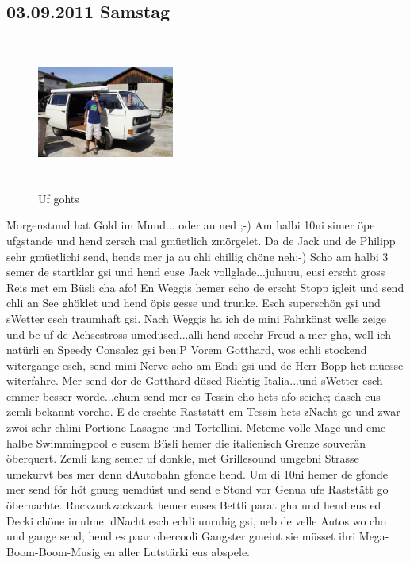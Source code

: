 \subsection{03.09.2011 Samstag}
\begin{figure} 
  \begin{centering}
    \includegraphics[width=0.4\textwidth, height=5cm, keepaspectratio]{../Bilder/Korsika/1.jpg}
    \caption{Uf gohts}
  \end{centering}
\end{figure} 
Morgenstund hat Gold im Mund... oder  au ned ;-) Am halbi 10ni simer öpe ufgstande und hend zersch mal gmüetlich zmörgelet.
Da de Jack und de Philipp sehr gmüetlichi send, hends mer ja au chli chillig chöne neh;-) Scho am halbi 3 semer de startklar gsi und hend euse Jack vollglade...juhuuu, eusi erscht gross Reis met em Büsli cha afo! En Weggis hemer scho de erscht Stopp igleit und send chli an See ghöklet und hend öpis gesse und trunke.
Esch superschön gsi und sWetter esch traumhaft gsi.
Nach Weggis ha ich de mini Fahrkönst welle zeige und be uf de Achsestross umedüsed...alli hend seeehr Freud a mer gha, well ich natürli en Speedy Consalez gsi ben:P
Vorem Gotthard, wos echli stockend witergange esch, send mini Nerve scho am Endi gsi und de Herr Bopp het müesse witerfahre.
Mer send dor de Gotthard düsed Richtig Italia...und sWetter esch emmer besser worde...chum send mer es Tessin cho hets afo seiche; dasch eus zemli bekannt vorcho.
E de erschte Raststätt em Tessin hets zNacht ge und zwar zwoi sehr chlini Portione Lasagne und Tortellini.
Meteme volle Mage und eme halbe Swimmingpool e eusem Büsli hemer die italienisch Grenze souverän öberquert.
Zemli lang semer uf donkle, met Grillesound umgebni Strasse umekurvt bes mer denn dAutobahn gfonde hend.
Um di 10ni hemer de gfonde mer send för höt gnueg uemdüst und send e Stond vor Genua ufe Raststätt go öbernachte.
Ruckzuckzackzack hemer euses Bettli parat gha und hend eus ed Decki chöne imulme.
dNacht esch echli unruhig gsi, neb de velle Autos wo cho und gange send, hend es paar obercooli Gangster gmeint sie müsset ihri Mega-Boom-Boom-Musig en aller Lutstärki eus abspele. 

